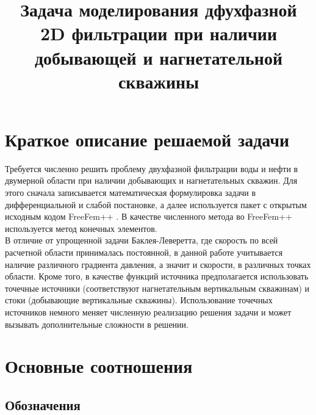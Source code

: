 


\title{Задача моделирования дфухфазной 2D фильтрации при наличии добывающей и нагнетательной скважины}


\maketitle



\section{Краткое описание решаемой задачи}

Требуется численно решить проблему двухфазной фильтрации воды и нефти в двумерной области при 
наличии добывающих и нагнетательных скважин. Для этого сначала записывается математическая 
формулировка задачи в дифференциальной и слабой постановке,
а далее используется пакет с открытым исходным кодом FreeFem++ \cite{MR3043640}. В качестве численного
метода во FreeFem++ используется метод конечных элементов.\\
В отличие от упрощенной задачи Баклея-Леверетта, где скорость по
всей расчетной области принималась постоянной, в данной работе учитывается 
наличие различного градиента давления, а значит и скорости, в различных точках области. Кроме того, в качестве
функций источника предполагается использовать точечные источники (соответствуют нагнетательным
вертикальным скважинам) и стоки (добывающие вертикальные скважины). Использование точечных 
источников немного меняет численную реализацию решения задачи и может вызывать дополнительные сложности в решении.

\section{Основные соотношения}

\subsection{Обозначения}

